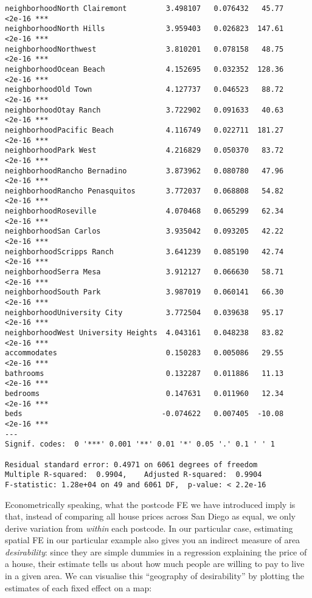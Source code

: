 \documentclass[
  letterpaper,
  krantz2]{style/krantz}
\begin{document}
\begin{verbatim}
neighborhoodNorth Clairemont         3.498107   0.076432   45.77   <2e-16 ***
neighborhoodNorth Hills              3.959403   0.026823  147.61   <2e-16 ***
neighborhoodNorthwest                3.810201   0.078158   48.75   <2e-16 ***
neighborhoodOcean Beach              4.152695   0.032352  128.36   <2e-16 ***
neighborhoodOld Town                 4.127737   0.046523   88.72   <2e-16 ***
neighborhoodOtay Ranch               3.722902   0.091633   40.63   <2e-16 ***
neighborhoodPacific Beach            4.116749   0.022711  181.27   <2e-16 ***
neighborhoodPark West                4.216829   0.050370   83.72   <2e-16 ***
neighborhoodRancho Bernadino         3.873962   0.080780   47.96   <2e-16 ***
neighborhoodRancho Penasquitos       3.772037   0.068808   54.82   <2e-16 ***
neighborhoodRoseville                4.070468   0.065299   62.34   <2e-16 ***
neighborhoodSan Carlos               3.935042   0.093205   42.22   <2e-16 ***
neighborhoodScripps Ranch            3.641239   0.085190   42.74   <2e-16 ***
neighborhoodSerra Mesa               3.912127   0.066630   58.71   <2e-16 ***
neighborhoodSouth Park               3.987019   0.060141   66.30   <2e-16 ***
neighborhoodUniversity City          3.772504   0.039638   95.17   <2e-16 ***
neighborhoodWest University Heights  4.043161   0.048238   83.82   <2e-16 ***
accommodates                         0.150283   0.005086   29.55   <2e-16 ***
bathrooms                            0.132287   0.011886   11.13   <2e-16 ***
bedrooms                             0.147631   0.011960   12.34   <2e-16 ***
beds                                -0.074622   0.007405  -10.08   <2e-16 ***
---
Signif. codes:  0 '***' 0.001 '**' 0.01 '*' 0.05 '.' 0.1 ' ' 1

Residual standard error: 0.4971 on 6061 degrees of freedom
Multiple R-squared:  0.9904,    Adjusted R-squared:  0.9904 
F-statistic: 1.28e+04 on 49 and 6061 DF,  p-value: < 2.2e-16
\end{verbatim}

Econometrically speaking, what the postcode FE we have introduced imply
is that, instead of comparing all house prices across San Diego as
equal, we only derive variation from \emph{within} each postcode. In our
particular case, estimating spatial FE in our particular example also
gives you an indirect measure of area \emph{desirability}: since they
are simple dummies in a regression explaining the price of a house,
their estimate tells us about how much people are willing to pay to live
in a given area. We can visualise this ``geography of desirability'' by
plotting the estimates of each fixed effect on a map:
\end{document}
